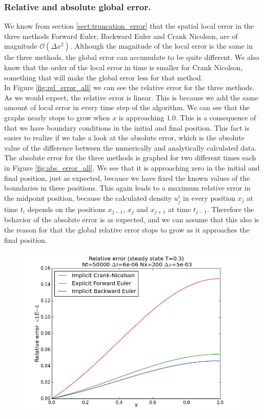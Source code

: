 \documentclass[12pt]{article}
\begin{document}
\begin{flushleft}
\subsubsection{Relative and absolute global error.}
We know from section \ref{sect:truncation_error} that the spatial local error in the three methods Forward Euler, Backward Euler and Crank Nicolson, are of magnitude $\mathcal{O}(\Delta x^2)$. Although the magnitude of the local error is the same in the three methods, the global error can accumulate to be quite different. We also know that the order of the local error in time is smaller for Crank Nicolson, something that will make the global error less for that method.\\
\vspace{5mm}
 In Figure \ref{fig:rel_error_all} we can see the relative error for the three methods. As we would expect, the relative error is linear. This is because we add the same amount of local error in every time step of the algorithm. We can see that the graphs nearly stops to grow when $x$ is approaching $1.0$. This is a consequence of that we have boundary conditions in the initial and final position. This fact is easier to realize if we take a look at the absolute error, which is the absolute value of the difference between the numerically and analytically calculated data. The absolute error for the three methods is graphed for two different times each in Figure \ref{fig:abs_error_all}. We see that it is approaching zero in the initial and final position, just as expected, because we have fixed the known values of the boundaries in these positions. This again leads to a maximum relative error in the midpoint position, because the calculated density $u^{i}_{j}$ in every position $x_{j}$ at time $t_i$ depends on the positions $x_{j-1}$, $x_j$ and $x_{j+1}$ at time $t_{j-1}$. Therefore the behavior of the absolute error is as expected, and we can assume that this also is the reason for that the global relative error stops to grow as it approaches the final position.\\
\newpage
\begin{figure}[!h]
\begin{center}
\includegraphics[scale=0.4]{rel_error_all}

\end{center}
\end{figure}
\end{flushleft}
\end{document}
